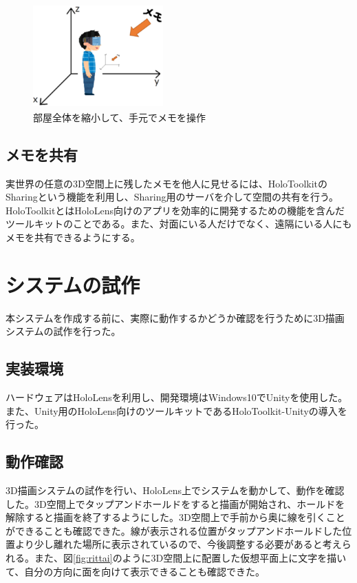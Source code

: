 \documentclass[twocolumn, a4paper]{UECIEresume}
\begin{document}
\begin{figure}[h]
  \begin{center}
    \includegraphics[clip,height=4.0cm,width=5.0cm]{./roomshukusho.eps}
    \caption{部屋全体を縮小して、手元でメモを操作}
    \label{fig:roomshukusho}
  \end{center}
\end{figure}

\subsection{メモを共有}
実世界の任意の3D空間上に残したメモを他人に見せるには、HoloToolkit\cite{tex7}のSharing\cite{tex8}という機能を利用し、Sharing用のサーバを介して空間の共有を行う。HoloToolkitとはHoloLens向けのアプリを効率的に開発するための機能を含んだツールキットのことである。また、対面にいる人だけでなく、遠隔にいる人にもメモを共有できるようにする。

\section{システムの試作}
本システムを作成する前に、実際に動作するかどうか確認を行うために3D描画システムの試作を行った。

\subsection{実装環境}
ハードウェアはHoloLensを利用し、開発環境はWindows10でUnity\cite{tex9}を使用した。また、Unity用のHoloLens向けのツールキットであるHoloToolkit-Unityの導入を行った。

\subsection{動作確認}
3D描画システムの試作を行い、HoloLens上でシステムを動かして、動作を確認した。3D空間上でタップアンドホールドをすると描画が開始され、ホールドを解除すると描画を終了するようにした。3D空間上で手前から奥に線を引くことができることも確認できた。線が表示される位置がタップアンドホールドした位置より少し離れた場所に表示されているので、今後調整する必要があると考えられる。また、図\ref{fig:rittai}のように3D空間上に配置した仮想平面上に文字を描いて、自分の方向に面を向けて表示できることも確認できた。
\end{document}
